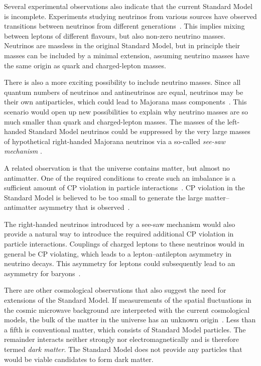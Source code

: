 Several experimental observations also indicate that the current Standard Model is incomplete. Experiments studying neutrinos from various
sources have observed transitions between neutrinos from different
generations~\cite{Fukuda:1998mi,*Ahmad:2002jz,*Eguchi:2002dm,*An:2012eh}. This implies mixing between leptons of different flavours, but
also non-zero neutrino masses. Neutrinos are massless in the original Standard Model, but in principle their masses can be included by a
minimal extension, assuming neutrino masses have the same origin as quark and charged-lepton masses.

There is also a more exciting possibility to include neutrino masses. Since all quantum numbers of neutrinos and antineutrinos are equal,
neutrinos may be their own antiparticles, which could lead to Majorana mass components~\cite{Majorana:1937vz}. This scenario would open up
new possibilities to explain why neutrino masses are so much smaller than quark and charged-lepton masses. The masses of the left-handed
Standard Model neutrinos could be suppressed by the very large masses of hypothetical right-handed Majorana neutrinos via a so-called
\emph{see-saw mechanism} \cite{Minkowski:1977sc}.

A related observation is that the universe contains matter, but almost no antimatter. One of the required conditions to create such an
imbalance is a sufficient amount of CP violation in particle interactions~\cite{Sakharov:1967dj}. CP violation in the Standard Model is
believed to be too small to generate the large matter--antimatter asymmetry that is
observed~\cite{Gavela:1993ts,*Huet:1994jb,*Gavela:1994dt}.

The right-handed neutrinos introduced by a see-saw mechanism would also provide a natural way to introduce the required additional CP
violation in particle interactions. Couplings of charged leptons to these neutrinos would in general be CP violating, which leads to a
lepton--antilepton asymmetry in neutrino decays. This asymmetry for leptons could subsequently lead to an asymmetry for
baryons~\cite{Kuzmin:1985mm,*Fukugita:1986hr}.

There are other cosmological observations that also suggest the need for extensions of the Standard Model. If measurements of the spatial
fluctuations in the cosmic microwave background are interpreted with the current cosmological models, the bulk of the matter in the
universe has an unknown origin~\cite{Hinshaw:2012aka}. Less than a fifth is conventional matter, which consists of Standard Model
particles. The remainder interacts neither strongly nor electromagnetically and is therefore termed \emph{dark matter}. The Standard Model
does not provide any particles that would be viable candidates to form dark matter.

